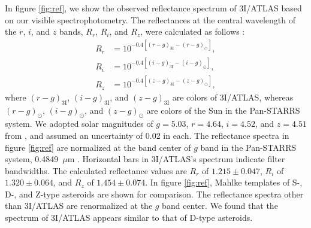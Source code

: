 \documentclass[]{pasj02}
\newcommand\I{3I/ATLAS\xspace}
\begin{document}
In figure \ref{fig:ref}, we show the observed reflectance spectrum of \I based on our visible spectrophotometry.
The reflectances at the central wavelength of the $r$, $i$, and $z$ bands, 
$R_r$, $R_i$, and $R_z$, were calculated as follows \citep[e.g.,][]{DeMeo2013}:
\begin{eqnarray}
    R_r &= 10^{-0.4[(r-g)_{\mathrm{3I}}-(r-g)_\odot]}, \\
    R_i &= 10^{-0.4[(i-g)_{\mathrm{3I}}-(i-g)_\odot]}, \\
    R_z &= 10^{-0.4[(z-g)_{\mathrm{3I}}-(z-g)_\odot]}, 
\end{eqnarray}
where 
$(r-g)_\mathrm{3I}$, $(i-g)_\mathrm{3I}$, and $(z-g)_\mathrm{3I}$ 
are colors of \I,
whereas
$(r-g)_\odot$, $(i-g)_\odot$, and $(z-g)_\odot$ 
are colors of the Sun in the Pan-STARRS system.
We adopted solar magnitudes of $g = 5.03$, $r = 4.64$, $i = 4.52$, and $z = 4.51$ from
\citet{Willmer2018}, and assumed an uncertainty of 0.02 in each.
The reflectance spectra in figure \ref{fig:ref} are normalized at the band center of $g$ band in the Pan-STARRS system, 0.4849~$\mu$m \citep{Willmer2018}.
Horizontal bars in \I's spectrum indicate filter bandwidths.
The calculated reflectance values are $R_r$ of $1.215\pm0.047$, $R_i$ of $1.320\pm0.064$, and $R_z$ of $1.454\pm0.074$.
In figure \ref{fig:ref}, Mahlke templates of S-, D-, and Z-type asteroids \citep{Mahlke2022} are shown for comparison.
The reflectance spectra other than \I are renormalized at the $g$ band center.
We found that the spectrum of \I appears similar to that of D-type asteroids.
\end{document}
